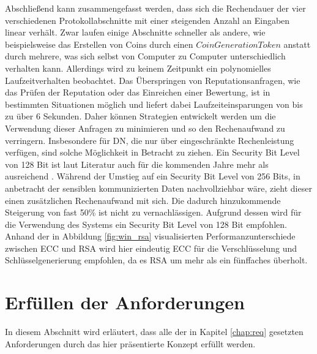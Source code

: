 \documentclass[
	fontsize=11pt,
	headings=small,
	parskip=half,           %
	bibliography=totoc,
	numbers=noenddot,       %
	open=any,               %
]{scrreprt}
\begin{document}
Abschließend kann zusammengefasst werden, dass sich die Rechendauer der vier verschiedenen Protokollabschnitte mit einer steigenden Anzahl an Eingaben linear verhält. Zwar laufen einige Abschnitte schneller als andere, wie beispielsweise das Erstellen von Coins durch einen $CoinGenerationToken$ anstatt durch mehrere, was sich selbst von Computer zu Computer unterschiedlich verhalten kann. Allerdings wird zu keinem Zeitpunkt ein polynomielles Laufzeitverhalten beobachtet. Das Überspringen von Reputationsanfragen, wie das Prüfen der Reputation oder das Einreichen einer Bewertung, ist in bestimmten Situationen möglich und liefert dabei Laufzeiteinsparungen von bis zu über 6 Sekunden. Daher können Strategien entwickelt werden um die Verwendung dieser Anfragen zu minimieren und so den Rechenaufwand zu verringern. Insbesondere für DN, die nur über eingeschränkte Rechenleistung verfügen, sind solche Möglichkeit in Betracht zu ziehen. Ein Security Bit Level von 128 Bit ist laut Literatur auch für die kommenden Jahre mehr als ausreichend \cite{elaine2016recommendation,bsi2020cryptographic}. Während der Umstieg auf ein Security Bit Level von 256 Bits, in anbetracht der sensiblen kommunizierten Daten nachvollziehbar wäre, zieht dieser einen zusätzlichen Rechenaufwand mit sich. Die dadurch hinzukommende Steigerung von fast 50\% ist nicht zu vernachlässigen. Aufgrund dessen wird für die Verwendung des Systems ein Security Bit Level von 128 Bit empfohlen. Anhand der in Abbildung \ref{fig:win_rsa} visualisierten Performanzunterschiede zwischen ECC und RSA wird hier eindeutig ECC für die Verschlüsselung und Schlüsselgenerierung empfohlen, da es RSA um mehr als ein fünffaches überholt.

\section{Erfüllen der Anforderungen}
In diesem Abschnitt wird erläutert, dass alle der in Kapitel \ref{chap:req} gesetzten Anforderungen durch das hier präsentierte Konzept erfüllt werden.
\end{document}

